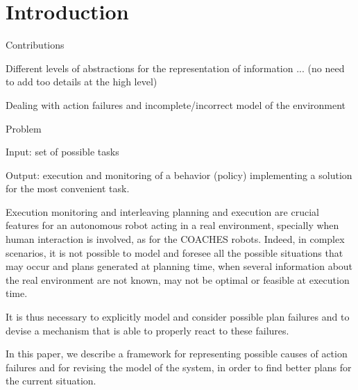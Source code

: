 \section{Introduction}

Contributions

Different levels of abstractions for the representation of information ...
(no need to add too details at the high level)


Dealing with action failures and incomplete/incorrect model of the environment


Problem

Input: set of possible tasks

Output: execution and monitoring of a behavior (policy) implementing a solution for the most convenient task.




Execution monitoring and interleaving planning and execution are crucial features for an autonomous robot acting in a real environment, specially when human interaction is involved, 
as for the COACHES robots. Indeed, in complex scenarios, it is not possible to model and foresee all the possible situations that may occur and plans generated at planning time, when several information about the real environment are not known, may not be optimal or feasible at execution time.

It is thus necessary to explicitly model and consider possible plan failures and to devise a mechanism that is able to properly react to these failures.

In this paper, we describe a framework for representing possible causes of action failures and for revising the model of the system, in order to find better plans for the current situation.
